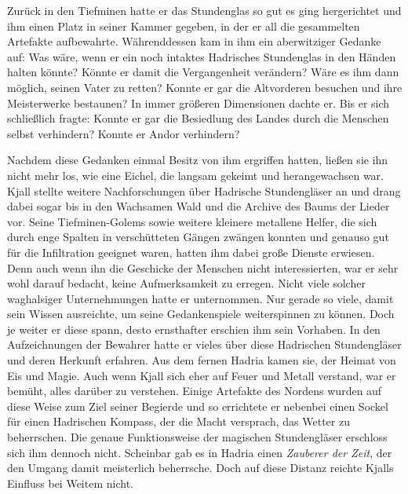 \documentclass[10pt, a4paper, oneside]{book}
\begin{document}
\begin{multicols}{2}
Zurück in den Tiefminen hatte er das Stundenglas so gut es ging hergerichtet und ihm einen Platz in seiner Kammer gegeben, in der er all die gesammelten Artefakte aufbewahrte. Währenddessen kam in ihm ein aberwitziger Gedanke auf: Was wäre, wenn er ein noch intaktes Hadrisches Stundenglas in den Händen halten könnte? Könnte er damit die Vergangenheit verändern? Wäre es ihm dann möglich, seinen Vater zu retten? Konnte er gar die Altvorderen besuchen und ihre Meisterwerke bestaunen? In immer größeren Dimensionen dachte er. Bis er sich schließlich fragte: Konnte er gar die Besiedlung des Landes durch die Menschen selbst verhindern? Konnte er Andor verhindern?\bigskip

Nachdem diese Gedanken einmal Besitz von ihm ergriffen hatten, ließen sie ihn nicht mehr los, wie eine Eichel, die langsam gekeimt und herangewachsen war. Kjall stellte weitere Nachforschungen über Hadrische Stundengläser an und drang dabei sogar bis in den Wachsamen Wald und die Archive des Baums der Lieder vor. Seine Tiefminen-Golems sowie weitere kleinere metallene Helfer, die sich durch enge Spalten in verschütteten Gängen zwängen konnten und genauso gut für die Infiltration geeignet waren, hatten ihm dabei große Dienste erwiesen. Denn auch wenn ihn die Geschicke der Menschen nicht interessierten, war er sehr wohl darauf bedacht, keine Aufmerksamkeit zu erregen. Nicht viele solcher waghalsiger Unternehmungen hatte er unternommen. Nur gerade so viele, damit sein Wissen ausreichte, um seine Gedankenspiele weiterspinnen zu können. Doch je weiter er diese spann, desto ernsthafter erschien ihm sein Vorhaben. In den Aufzeichnungen der Bewahrer hatte er vieles über diese Hadrischen Stundengläser und deren Herkunft erfahren. Aus dem fernen Hadria kamen sie, der Heimat von Eis und Magie. Auch wenn Kjall sich eher auf Feuer und Metall verstand, war er bemüht, alles darüber zu verstehen. Einige Artefakte des Nordens wurden auf diese Weise zum Ziel seiner Begierde und so errichtete er nebenbei einen Sockel für einen Hadrischen Kompass, der die Macht versprach, das Wetter zu beherrschen. Die genaue Funktionsweise der magischen Stundengläser erschloss sich ihm dennoch nicht. Scheinbar gab es in Hadria einen \textit{Zauberer der Zeit}, der den Umgang damit meisterlich beherrsche. Doch auf diese Distanz reichte Kjalls Einfluss bei Weitem nicht.\bigskip


\end{multicols}
\end{document}
